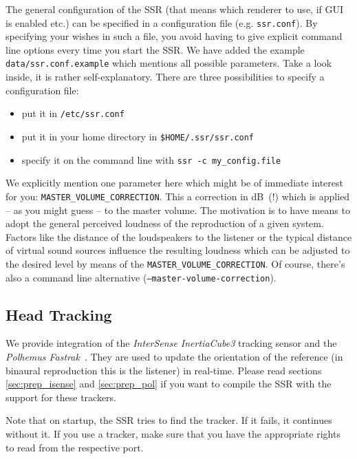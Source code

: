 The general configuration of the SSR (that means which renderer to use, if GUI
is enabled etc.) can be specified in a configuration file
(e.g. \texttt{ssr.conf}). By specifying
your wishes in such a file, you avoid having to give explicit command
line options every time you start the SSR. We have added the example
\texttt{data/ssr.conf.example} which mentions all possible parameters.
Take a look inside, it is rather self-explanatory.
There are three possibilities to specify a configuration file:
\begin{itemize}
\item put it in \texttt{/etc/ssr.conf}
\item put it in your home directory in \texttt{\$HOME/.ssr/ssr.conf}
\item specify it on the command line with \texttt{ssr -c my\_config.file}
\end{itemize}

We explicitly mention one parameter here which might be of immediate interest
for you: \texttt{MASTER\_VOLUME\_CORRECTION}. This a correction in dB~(!) which is
applied -- as you might guess -- to the master volume. The motivation is to have
means to adopt the general perceived loudness of the reproduction of a given
system. Factors like the distance of the loudspeakers to the listener or the
typical distance of virtual sound sources influence the resulting loudness
which can be adjusted to the desired level by means of the
\texttt{MASTER\_VOLUME\_CORRECTION}. Of course, there's also a command line
alternative (\texttt{--master-volume-correction}).

\subsection{Head Tracking}
\label{sec:head_tracking}

We provide integration of the \emph{InterSense InertiaCube3} tracking sensor
\cite{intersense} and the  \emph{Polhemus Fastrak}~\cite{fastrack}. They are used to
update the orientation of the reference (in binaural reproduction this is the
listener) in real-time. Please read sections \ref{sec:prep_isense} and
\ref{sec:prep_pol} if you want to compile the SSR with the support for these
trackers.

Note that on startup, the SSR tries to find the tracker. If it fails, it
continues without it. If you use a tracker, make sure that you have the
appropriate rights to read from the respective port.

